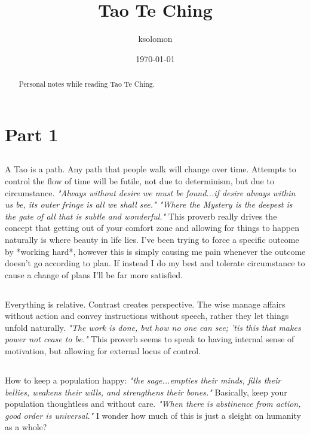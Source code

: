 \documentclass[a4paper, 10pt]{article}
\title{Tao Te Ching}
\author{ksolomon}
\date{\today}
\begin{document}
\maketitle

\begin{abstract}
	Personal notes while reading Tao Te Ching.
\end{abstract}



\section{Part 1}
\subsection{}
A Tao is a path. Any path that people walk will change over time. Attempts to control the flow of time will be futile, not due to determinism, but due to circumstance. \textit{"Always without desire we must be found...if desire always within us be, its outer fringe is all we shall see." "Where the Mystery is the deepest is the gate of all that is subtle and wonderful."} This proverb really drives the concept that getting out of your comfort zone and allowing for things to happen naturally is where beauty in life lies. I've been trying to force a specific outcome by *working hard*, however this is simply causing me pain whenever the outcome doesn't go according to plan. If instead I do my best and tolerate circumstance to cause a change of plans I'll be far more satisfied.
\subsection{}
Everything is relative. Contrast creates perspective. The wise manage affairs without action and convey instructions without speech, rather they let things unfold naturally. \textit{"The work is done, but how no one can see; 'tis this that makes power not cease to be."} This proverb seems to speak to having internal sense of motivation, but allowing for external locus of control.
\subsection{}
How to keep a population happy: \textit{"the sage...empties their minds, fills their bellies, weakens their wills, and strengthens their bones."} Basically, keep your population thoughtless and without care. \textit{"When there is abstinence from action, good order is universal."} I wonder how much of this is just a sleight on humanity as a whole?
\end{document}
